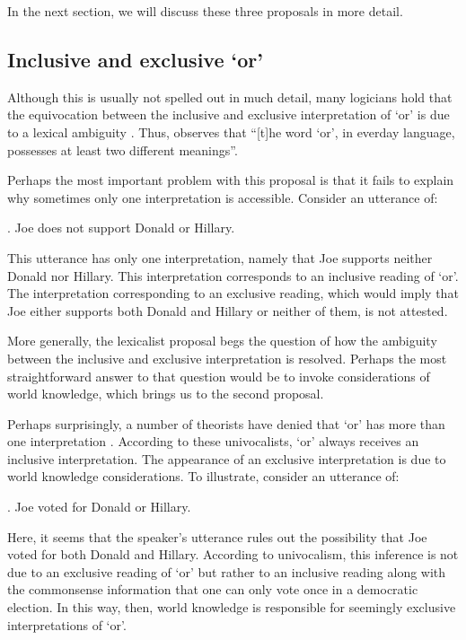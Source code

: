 \documentclass[12pt]{article}
\begin{document}
In the next section, we will discuss these three proposals in more detail.

\subsection*{Inclusive and exclusive `or'}

Although this is usually not spelled out in much detail, many logicians hold that the equivocation between the inclusive and exclusive interpretation of `or' is due to a lexical ambiguity \citep[e.g.,][]{basson1960, baum1996, rescher1964}. Thus, \citet[p.\ 21]{tarski1946} observes that ``[t]he word `or', in everday language, possesses at least two different meanings''.

Perhaps the most important problem with this proposal is that it fails to explain why sometimes only one interpretation is accessible. Consider an utterance of:

\ex.	 Joe does not support Donald or Hillary.

This utterance has only one interpretation, namely that Joe supports neither Donald nor Hillary. This interpretation corresponds to an inclusive reading of `or'. The interpretation corresponding to an exclusive reading, which would imply that Joe either supports both Donald and Hillary or neither of them, is not attested.

More generally, the lexicalist proposal begs the question of how the ambiguity between the inclusive and exclusive interpretation is resolved. Perhaps the most straightforward answer to that question would be to invoke considerations of world knowledge, which brings us to the second proposal.

Perhaps surprisingly, a number of theorists have denied that `or' has more than one interpretation \citep[e.g.,][]{rubin1989, yanal1988}. According to these univocalists, `or' always receives an inclusive interpretation. The appearance of an exclusive interpretation is due to world knowledge considerations. To illustrate, consider an utterance of:

\ex.	Joe voted for Donald or Hillary.

Here, it seems that the speaker's utterance rules out the possibility that Joe voted for both Donald and Hillary. According to univocalism, this inference is not due to an exclusive reading of `or' but rather to an inclusive reading along with the commonsense information that one can only vote once in a democratic election. In this way, then, world knowledge is responsible for seemingly exclusive interpretations of `or'.
\end{document}
